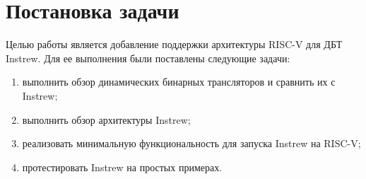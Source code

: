 
\section{Постановка задачи}
\label{sec:task}

Целью работы является добавление поддержки архитектуры \mbox{RISC-V} для ДБТ Instrew. Для ее выполнения были поставлены следующие задачи:
\begin{enumerate}
    \item выполнить обзор динамических бинарных трансляторов и сравнить их с Instrew;
    \item выполнить обзор архитектуры Instrew;
    \item реализовать минимальную функциональность для запуска Instrew на RISC-V;
    \item протестировать Instrew на простых примерах.
\end{enumerate}

